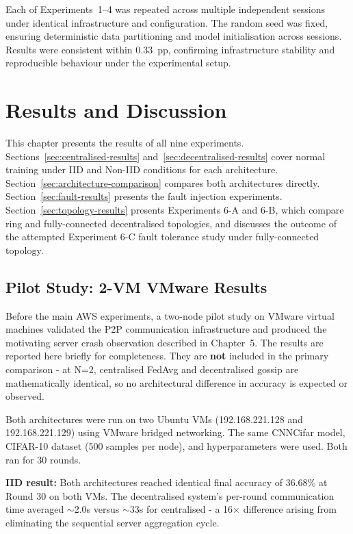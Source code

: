 \documentclass[12pt]{report}
\begin{document}
Each of Experiments~1--4 was repeated across multiple independent sessions under
identical infrastructure and configuration. The random seed was fixed, ensuring
deterministic data partitioning and model initialisation across sessions. Results
were consistent within 0.33~pp, confirming infrastructure stability and
reproducible behaviour under the experimental setup.

\chapter{Results and Discussion}

This chapter presents the results of all nine experiments. Sections~\ref{sec:centralised-results}
and~\ref{sec:decentralised-results} cover normal training under IID and Non-IID
conditions for each architecture. Section~\ref{sec:architecture-comparison} compares
both architectures directly. Section~\ref{sec:fault-results} presents the fault
injection experiments. Section~\ref{sec:topology-results} presents Experiments 6-A
and 6-B, which compare ring and fully-connected decentralised topologies, and
discusses the outcome of the attempted Experiment 6-C fault tolerance study under
fully-connected topology.

\section{Pilot Study: 2-VM VMware Results}
\label{sec:pilot-results}
 
Before the main AWS experiments, a two-node pilot study on VMware
virtual machines validated the P2P communication infrastructure and
produced the motivating server crash observation described in
Chapter~5. The results are reported here briefly for completeness.
They are \textbf{not} included in the primary comparison - at N=2,
centralised FedAvg and decentralised gossip are mathematically
identical, so no architectural difference in accuracy is expected or
observed.
 
Both architectures were run on two Ubuntu VMs (192.168.221.128 and
192.168.221.129) using VMware bridged networking. The same CNNCifar
model, CIFAR-10 dataset (500 samples per node), and hyperparameters
were used. Both ran for 30 rounds.
 
\textbf{IID result:} Both architectures reached identical final
accuracy of 36.68\% at Round 30 on both VMs. The decentralised
system's per-round communication time averaged $\sim$2.0s versus
$\sim$33s for centralised - a 16$\times$ difference arising from
eliminating the sequential server aggregation cycle.
 
\end{document}
